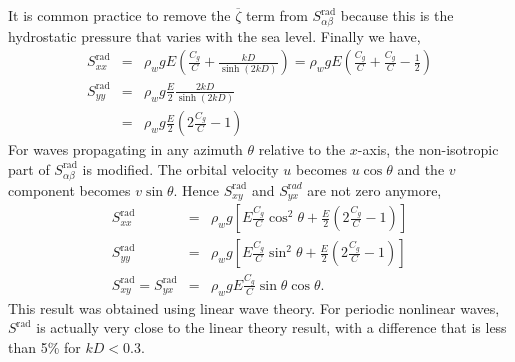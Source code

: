 It is common practice to remove the $\overline{\zeta}$ term from  $S^{\mathrm{rad}}_{\alpha \beta}$ because 
this is the hydrostatic pressure that varies with the sea level. Finally we have, 
\begin{eqnarray}
S^{\mathrm{rad}}_{xx} & = & \rho_w g E\left(\frac{C_g}{C} +  \frac{kD}{\sinh\left(2kD\right)}\right) 
   = \rho_w g E\left(\frac{C_g}{C} + \frac{C_g}{C}-  \frac{1}{2}\right) \label{eq:Sxx} \\
 S^{\mathrm{rad}}_{yy} & = &\rho_w g  \frac{E}{2} \frac{2kD}{\sinh\left(2kD\right)}\\
    & = &  \rho_w g \frac{E}{2}\left(2\frac{C_g}{C}-1\right)
\end{eqnarray}
For waves propagating in any azimuth $\theta$ relative to the $x$-axis, the non-isotropic part of
 $S^{\mathrm{rad}}_{\alpha \beta}$ is modified. The orbital velocity $u$ becomes $u \cos \theta$ 
and the  $v$ component becomes $v \sin \theta$. Hence $S^{\mathrm{rad}}_{xy}$ and $S^{\mathrm
rad}_{yx}$ are not zero anymore, 
\begin{eqnarray}
S^{\mathrm{rad}}_{xx} & = & \rho_w g \left[ E \frac{C_g}{C} \cos^2 \theta
    +   \frac{E}{2}\left(2\frac{C_g}{C}-1\right)\right]\\
 S^{\mathrm{rad}}_{yy} & = &  \rho_w g \left[ E \frac{C_g}{C} \sin^2 \theta
        +  \frac{E}{2}\left(2\frac{C_g}{C}-1\right)\right]\\
 S^{\mathrm{rad}}_{xy}=S^{\mathrm{rad}}_{yx} & = &  \rho_w g E \frac{C_g}{C} \sin \theta \cos \theta.
\end{eqnarray}
This result was obtained using linear wave theory. For periodic nonlinear waves, $S^{\mathrm{rad}}$ is actually very close to the linear theory result, 
with a difference that is less than  5\% for $kD < 0.3$. 

